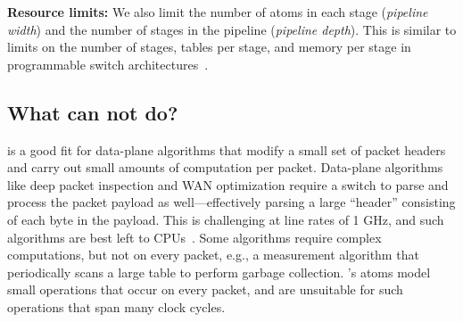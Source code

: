 \textbf{Resource limits:} We also limit the number of atoms in each stage
(\textit{pipeline width}) and the number of stages in the pipeline
(\textit{pipeline depth}). This is similar to limits on the number of stages,
tables per stage, and memory per stage in programmable switch
architectures~\cite{lavanya_compiler}.

\subsection{What can \absmachine not do?}
\label{ss:limitations}

\absmachine is a good fit for data-plane algorithms that modify a small set of
packet headers and carry out small amounts of computation per packet.
Data-plane algorithms like deep packet inspection and WAN optimization require
a switch to parse and process the packet payload as well---effectively parsing
a large ``header'' consisting of each byte in the payload. This is challenging
at line rates of 1 GHz, and such algorithms are best left to CPUs~\cite{e2}.
Some algorithms require complex computations, but not on every packet, e.g., a
measurement algorithm that periodically scans a large table to perform garbage
collection.  \absmachine's atoms model small operations that occur on every
packet, and are unsuitable for such operations that span many clock cycles.
